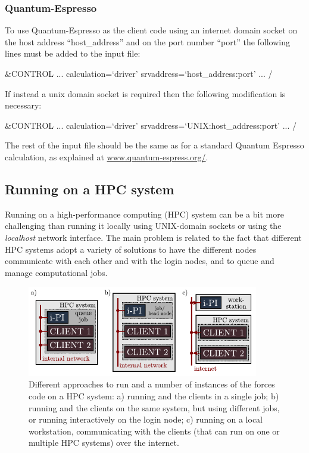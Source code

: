 \documentclass[11pt,english,fleqn]{report}
\newenvironment{code}{%
\footnotesize 
\verbatim
}{
\endverbatim
\normalsize
}
\begin{document}
\subsubsection{Quantum-Espresso}

To use Quantum-Espresso as the client code using an 
internet domain socket on the host
address {}``host\_address'' and on the port number {}``port''
the following lines must be added to the input file:

\begin{code}
&CONTROL
   ...
   calculation=`driver'
   srvaddress=`host_address:port'
   ...
/
\end{code}

If instead a unix domain socket is required then the following
modification is necessary:


\begin{code}
&CONTROL
   ...
   calculation=`driver'
   srvaddress=`UNIX:host_address:port'
   ...
/
\end{code}

The rest of the input file should be the same as for a standard Quantum
Espresso calculation, as explained at \url{www.quantum-espress.org/}.

\subsection{Running on a HPC system}\label{hpc}

Running \ipi on a high-performance computing (HPC) system can be a bit more challenging
than running it locally using UNIX-domain sockets or using the \emph{localhost} 
network interface.
The main problem is related to the fact that different HPC systems adopt
a variety of solutions to have the different nodes communicate with each other
and with the login nodes, and to queue and manage computational jobs. 
 
\begin{figure}[hbt]
\centering\includegraphics[width=0.9\textwidth]{ipi-running.pdf}
\caption{\label{fig:running} Different approaches to run \ipi and a number of 
instances of the forces code on a HPC system: a) running \ipi and the clients in a single
job; b) running \ipi and the clients on the same system, but using different jobs, or running
\ipi interactively on the login node; c) running \ipi on a local workstation, communicating
with the clients (that can run on one or multiple HPC systems) over the internet. } 
\end{figure}
\end{document}
